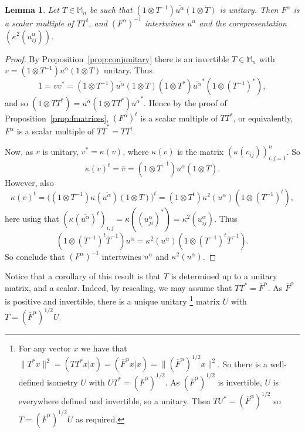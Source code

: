 \documentclass[twoside,a4paper,12pt]{article}
\theoremstyle{plain}
\newtheorem{lemma}[proposition]{Lemma}
\theoremstyle{definition}
\begin{document}
\begin{lemma}\label{lem:fmatrixkappa}
Let $T\in\mathbb M_n$ be such that $(1\otimes T^{-1})\overline{u^\alpha}
(1\otimes T)$ is unitary.  Then $F^\alpha$ is a scalar multiple of
$\overline{T}T^t$, and $(F^\alpha)^{-1}$ intertwines $u^\alpha$ and the
corepresentation $(\kappa^2(u^\alpha_{ij}))$.
\end{lemma}
\begin{proof}
By Proposition~\ref{prop:conjunitary} there is an invertible $T\in\mathbb M_n$
with $v = (1\otimes T^{-1}) \overline{u^\alpha} (1\otimes T)$ unitary.
Thus
\[ 1 = vv^* = (1\otimes T^{-1}) \overline{u^\alpha} (1\otimes T)
(1\otimes T^*) \overline{u^\alpha}^* (1\otimes (T^{-1})^*), \]
and so $(1\otimes TT^*) = \overline{u^\alpha} (1\otimes TT^*)
\overline{u^\alpha}^*$.  Hence by the proof of Proposition~\ref{prop:fmatrices},
$(F^\alpha)^t$ is a scalar multiple of $TT^*$, or equivalently,
$F^\alpha$ is a scalar multiple of $\overline{T}\overline{T}^*
= \overline{T} T^t$.

Now, as $v$ is unitary, $v^* = \kappa(v)$, where $\kappa(v)$ is the
matrix $(\kappa(v_{ij}))_{i,j=1}^n$.  So
\[ \kappa(v)^t = \overline{v}
= (1\otimes\overline{T}^{-1})u^\alpha(1\otimes\overline{T}). \]
However, also
\[ \kappa(v)^t = \big( (1\otimes T^{-1}) \kappa(\overline{u^\alpha})
(1\otimes T) \big)^t
= (1\otimes T^t) \kappa^2(u^\alpha) (1\otimes (T^{-1})^t), \]
here using that $(\kappa(\overline{u^\alpha})^t)_{i,j} =
\kappa((u^\alpha_{ji})^*) = \kappa^2(u^\alpha_{ij})$.  Thus
\[ (1\otimes (T^{-1})^t \overline{T}^{-1}) u^\alpha
= \kappa^2(u^\alpha) (1\otimes (T^{-1})^t \overline{T}^{-1}). \]
So conclude that $(F^\alpha)^{-1}$ intertwines $u^\alpha$ and
$\kappa^2(u^\alpha)$.
\end{proof}

Notice that a corollary of this result is that $T$ is determined up to a unitary
matrix, and a scalar.  Indeed, by rescaling, we may assume that
$T T^* = \overline F^\alpha$.  As $\overline F^\alpha$ is positive and invertible,
there is a unique unitary%
\footnote{For any vector $x$ we have that $\|T^*x\|^2 = (TT^*x|x)
= (\overline F^\alpha x|x) = \| (\overline F^\alpha)^{1/2} x \|^2$.
So there is a well-defined isometry $U$ with $UT^* = 
(\overline F^\alpha)^{1/2}$.  As $(\overline F^\alpha)^{1/2}$ is invertible,
$U$ is everywhere defined and invertible, so a unitary.  Then $TU^* =
(\overline F^\alpha)^{1/2}$ so $T = (\overline F^\alpha)^{1/2}U$ as required.}
matrix $U$ with $T = (\overline F^\alpha)^{1/2} U$.
\end{document}
